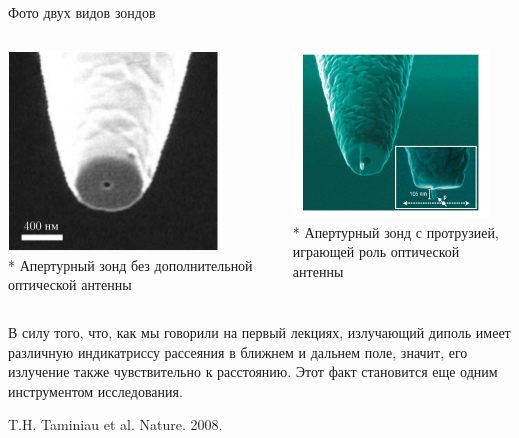 \documentclass[9pt, compress, xcolor=table]{beamer}
\begin{document}

\begin{frame}{Фото двух видов зондов}
\begin{columns}[c]
\column{6.5cm}
\begin{center}
\includegraphics[width=0.8\textwidth]{nfm13}
\\* Апертурный зонд без дополнительной оптической антенны
\end{center}

\column{6.5cm}
\begin{center}
\includegraphics[width=0.9\textwidth]{nfm22}
\\* Апертурный зонд с протрузией, играющей роль оптической антенны
\end{center}
\end{columns}
В силу того, что, как мы говорили на первый лекциях, излучающий диполь имеет различную индикатриссу рассеяния в ближнем и дальнем поле, значит, его излучение также чувствительно к расстоянию. Этот факт становится еще одним инструментом исследования.

T.H. Taminiau et al. Nature. 2008.

\end{frame}
\end{document}
